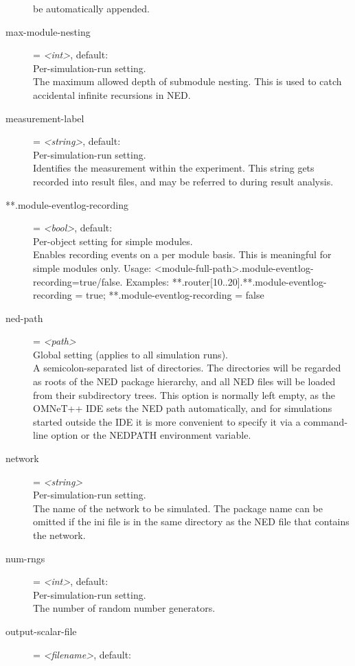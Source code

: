 \begin{description}
    be automatically appended.
\item[max-module-nesting] = \textit{<int>}, default: \\
    Per-simulation-run setting.\\
    The maximum allowed depth of submodule nesting. This is used to catch
    accidental infinite recursions in NED.
\item[measurement-label] = \textit{<string>}, default: \\
    Per-simulation-run setting.\\
    Identifies the measurement within the experiment. This string gets recorded
    into result files, and may be referred to during result analysis.
\item[**.module-eventlog-recording] = \textit{<bool>}, default: \\
    Per-object setting for simple modules.\\
    Enables recording events on a per module basis. This is meaningful for
    simple modules only. Usage:
    <module-full-path>.module-eventlog-recording=true/false. Examples:
    **.router[10..20].**.module-eventlog-recording = true;
    **.module-eventlog-recording = false
\item[ned-path] = \textit{<path>}\\
    Global setting (applies to all simulation runs).\\
    A semicolon-separated list of directories. The directories will be regarded
    as roots of the NED package hierarchy, and all NED files will be loaded
    from their subdirectory trees. This option is normally left empty, as the
    OMNeT++ IDE sets the NED path automatically, and for simulations started
    outside the IDE it is more convenient to specify it via a command-line
    option or the NEDPATH environment variable.
\item[network] = \textit{<string>}\\
    Per-simulation-run setting.\\
    The name of the network to be simulated.  The package name can be omitted
    if the ini file is in the same directory as the NED file that contains the
    network.
\item[num-rngs] = \textit{<int>}, default: \\
    Per-simulation-run setting.\\
    The number of random number generators.
\item[output-scalar-file] = \textit{<filename>}, default: \\

\end{description}
